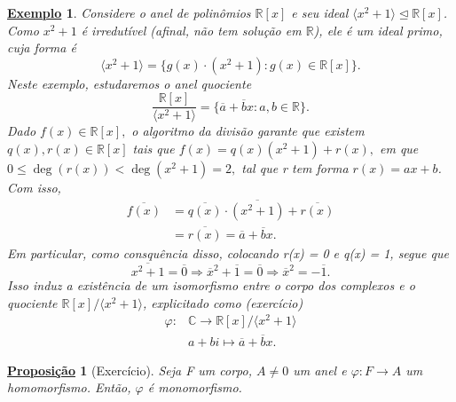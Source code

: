 \documentclass{article}
\newtheorem*{prop*}{\underline{Proposi\c c\~ao}}
\newtheorem{example}{\underline{Exemplo}}
\begin{document}
\begin{example}
  Considere o anel de polinômios \(\mathbb{R}[x]\) e seu ideal \(\langle x^{2}+1 \rangle\trianglelefteq \mathbb{R}[x]\).
Como \(x^{2}+1\) é irredutível (afinal, não tem solução em \(\mathbb{R}\)), ele é um ideal primo, cuja forma é 
  \[
    \langle x^{2}+1 \rangle = \{g(x)\cdot (x^{2}+1):g(x)\in \mathbb{R}[x]\}.
  \]
Neste exemplo, estudaremos o anel quociente 
  \[
    \frac{\mathbb{R}[x]}{\langle x^{2}+1 \rangle} = \{\overline{a} + \overline{b}x: a, b\in \mathbb{R}\}.
  \]
  Dado \(f(x)\in \mathbb{R}[x],\) o algoritmo da divisão garante que existem \(q(x), r(x)\in \mathbb{R}[x]\) tais que 
 \(f(x) = q(x)(x^{2}+1) + r(x),\) em que \(0 \leq \deg{(r(x))} < \deg{(x^{2}+1)} = 2,\) tal que r tem forma \(r(x) = ax + b\).
 Com isso, 
\begin{align*}
  \overline{f(x)} &= \overline{q(x)}\cdot \overline{(x^{2}+1)} + \overline{r(x)}\\
                  &= \overline{r(x)} = \overline{a}+\overline{b}x.
\end{align*}
  Em particular, como consquência disso, colocando r(x) = 0 e q(x) = 1, segue que 
    \[
      \overline{x^{2}+1} = \overline{0} \Rightarrow \overline{x}^{2} + \overline{1} = \overline{0} \Rightarrow \overline{x}^{2} = -\overline{1}.
    \]
Isso induz a existência de um isomorfismo entre o corpo dos complexos e o quociente \(\mathbb{R}[x]/\langle x^{2}+1 \rangle\), explicitado como (exercício)
\begin{align*}
  \varphi :&\mathbb{C}\rightarrow \mathbb{R}[x]/\langle x^{2}+1 \rangle\\
           &a + bi\mapsto \overline{a} + \overline{b}x.
\end{align*}
\end{example}
\begin{prop*}[Exercício]
  Seja F um corpo, \(A\neq 0\) um anel e \(\varphi : F\rightarrow A\) um homomorfismo. Então, \(\varphi \) é monomorfismo.
\end{prop*}
\end{document}
